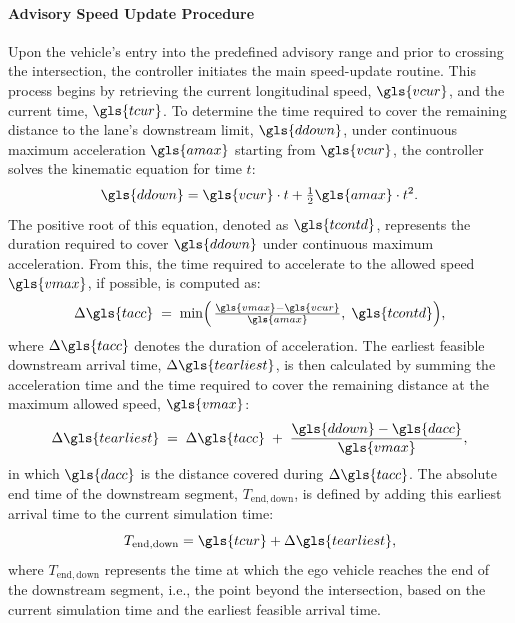 \paragraph{Advisory Speed Update Procedure}
\label{par:Advisory_Speed_Update_Procedure}
Upon the vehicle's entry into the predefined advisory range and prior to crossing the intersection, the controller initiates the main speed-update routine. This process begins by retrieving the current longitudinal speed, $\gls{vcur}$, and the current time, $\gls{tcur}$.
To determine the time required to cover the remaining distance to the lane's downstream limit, $\gls{ddown}$, under continuous maximum acceleration $\gls{amax}$ starting from $\gls{vcur}$, the controller solves the kinematic equation for time $t$:
\begin{equation}
   \gls{ddown} = \gls{vcur} \cdot t + \tfrac{1}{2} \gls{amax} \cdot t^2.
\end{equation}
The positive root of this equation, denoted as $\gls{tcontd}$, represents the duration required to cover $\gls{ddown}$ under continuous maximum acceleration. From this, the time required to accelerate to the allowed speed $\gls{vmax}$, if possible, is computed as:
\begin{equation}
    \Delta \gls{tacc}
    \;=\;
    \min\Bigl(\,\tfrac{\gls{vmax} - \gls{vcur}}{\gls{amax}},\;
    \gls{tcontd}\Bigr),
\end{equation}
where $\Delta \gls{tacc}$ denotes the duration of acceleration. The earliest feasible downstream arrival time, $\Delta \gls{tearliest}$, is then calculated by summing the acceleration time and the time required to cover the remaining distance at the maximum allowed speed, $\gls{vmax}$:
\begin{equation}
    \Delta \gls{tearliest}
    \;=\;
    \Delta \gls{tacc} \;+\;
    \frac{\gls{ddown} - \gls{dacc}}{\,\gls{vmax}\,},
\end{equation}
in which $\gls{dacc}$ is the distance covered during $\Delta \gls{tacc}$. The absolute end time of the downstream segment, $T_{\mathrm{end,down}}$, is defined by adding this earliest arrival time to the current simulation time:
\begin{equation}
    T_{\mathrm{end,down}} = \gls{tcur} + \Delta \gls{tearliest},
\end{equation}
where $T_{\mathrm{end,down}}$ represents the time at which the ego vehicle reaches the end of the downstream segment, i.e., the point beyond the intersection, based on the current simulation time and the earliest feasible arrival time.
